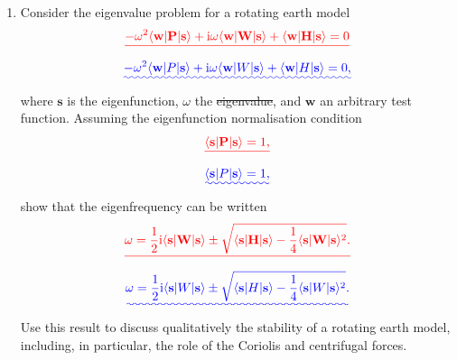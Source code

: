 \documentclass[a4paper,10pt]{paper}
\providecommand{\DIFadd}[1]{{\protect\color{blue}\uwave{#1}}} %
\providecommand{\DIFdel}[1]{{\protect\color{red}\sout{#1}}}                      %
\providecommand{\DIFaddbegin}{} %
\providecommand{\DIFaddend}{} %
\providecommand{\DIFdelbegin}{} %
\providecommand{\DIFdelend}{} %
\begin{document}
\begin{enumerate}
\item Consider the eigenvalue problem for a rotating earth model
\DIFdelbegin \begin{displaymath}
    \DIFdel{-\omega^{2}\langle \mathbf{w}|\mathbf{P}|\mathbf{s}\rangle+\ii\omega\langle \mathbf{w}|\mathbf{W}|\mathbf{s}\rangle+\langle \mathbf{w}|\mathbf{H}|\mathbf{s}\rangle=0
}\end{displaymath}%
\DIFdelend \DIFaddbegin \begin{equation*}
    \DIFadd{-\omega^{2}\langle \mathbf{w}|P|\mathbf{s}\rangle+\ii\omega\langle \mathbf{w}|W|\mathbf{s}\rangle+\langle \mathbf{w}|H|\mathbf{s}\rangle=0,
}\end{equation*}\DIFaddend 
where $\mathbf{s}$ is the eigenfunction, $\omega$ the \DIFdelbegin \DIFdel{eigenvalue}\DIFdelend \DIFaddbegin \DIFadd{eigenfrequency}\DIFaddend , and $\mathbf{w}$ an arbitrary test function. Assuming the eigenfunction normalisation condition
\DIFdelbegin \begin{displaymath}
    \DIFdel{\langle \mathbf{s}|\mathbf{P}|\mathbf{s}\rangle=1,
}\end{displaymath}%
\DIFdelend \DIFaddbegin \begin{equation*}
    \DIFadd{\langle \mathbf{s}|P|\mathbf{s}\rangle=1,
}\end{equation*}\DIFaddend 
show that the eigenfrequency can be written
\DIFdelbegin \begin{displaymath}
    \DIFdel{\omega=\frac{1}{2}\ii\langle \mathbf{s}|\mathbf{W}|\mathbf{s}\rangle\pm\sqrt{\langle \mathbf{s}|\mathbf{H}|\mathbf{s}\rangle-\frac{1}{4}\langle \mathbf{s}|\mathbf{W}|\mathbf{s}\rangle^{2}}.
}\end{displaymath}%
\DIFdelend \DIFaddbegin \begin{equation*}
    \DIFadd{\omega=\frac{1}{2}\ii\langle \mathbf{s}|W|\mathbf{s}\rangle\pm\sqrt{\langle \mathbf{s}|H|\mathbf{s}\rangle-\frac{1}{4}\langle \mathbf{s}|W|\mathbf{s}\rangle^{2}}.
}\end{equation*}\DIFaddend 
Use this result to discuss qualitatively the stability of a rotating earth model, including, in particular, the role of the Coriolis and centrifugal forces.

\end{enumerate}
\end{document}
